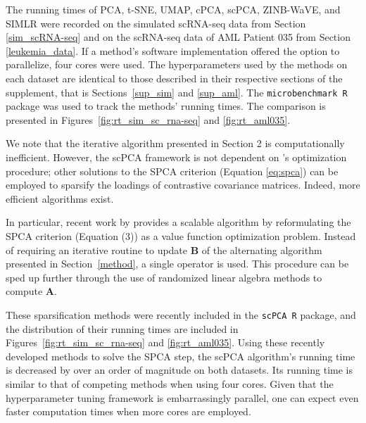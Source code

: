 \documentclass{article}
\begin{document}
The running times of PCA, t-SNE, UMAP, cPCA, scPCA, ZINB-WaVE, and SIMLR were recorded on the simulated scRNA-seq data from Section \ref{sim_scRNA-seq} and on the scRNA-seq data of AML Patient 035 from Section \ref{leukemia_data}.
If a method's software implementation offered the option to parallelize, four cores were used. The hyperparameters used by the methods on each dataset are identical to those described in their respective sections of the supplement, that is Sections~\ref{sup_sim} and \ref{sup_aml}. The \texttt{microbenchmark R} package was used to track the methods' running times. The comparison is presented in Figures~\ref{fig:rt_sim_sc_rna-seq} and \ref{fig:rt_aml035}.

We note that the iterative algorithm presented in Section 2 is computationally inefficient. However, the scPCA framework is not dependent on \citet{Zou2006}'s optimization procedure; other solutions to the SPCA criterion (Equation \ref{eq:spca}) can be employed to sparsify the loadings of contrastive covariance matrices. Indeed, more efficient algorithms exist.

In particular, recent work by \citet{erichson2018sparse} provides a scalable algorithm by reformulating the SPCA criterion (Equation (3)) as a value function optimization problem. Instead of requiring an iterative routine to update $\mathbf{B}$ of the alternating algorithm presented in Section~\ref{method}, a single operator is used. This procedure can be sped up further through the use of randomized linear algebra methods to compute $\mathbf{A}$.

These sparsification methods were recently included in the \texttt{scPCA R} package, and the distribution of their running times are included in Figures~\ref{fig:rt_sim_sc_rna-seq} and \ref{fig:rt_aml035}. Using these recently developed methods to solve the SPCA step, the scPCA algorithm's running time is decreased by over an order of magnitude on both datasets. Its running time is similar to that of competing methods when using four cores. Given that the hyperparameter tuning framework is embarrassingly parallel, one can expect even faster computation times when more cores are employed.
\end{document}
